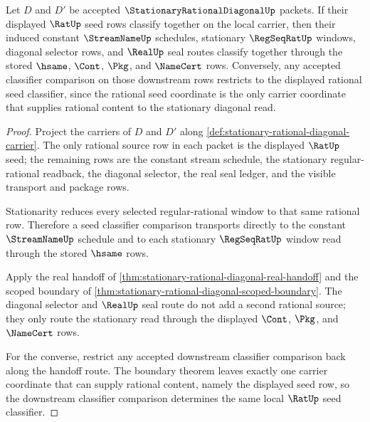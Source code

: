 \begin{theorem}
\label{thm:stationary-rational-diagonal-classifier-determinacy}
Let $D$ and $D'$ be accepted $\StationaryRationalDiagonalUp$ packets. If their
displayed $\RatUp$ seed rows classify together on the local carrier, then their
induced constant $\StreamNameUp$ schedules, stationary $\RegSeqRatUp$ windows,
diagonal selector rows, and $\RealUp$ seal routes classify together through the
stored $\hsame$, $\Cont$, $\Pkg$, and $\NameCert$ rows. Conversely, any accepted
classifier comparison on those downstream rows restricts to the displayed
rational seed classifier, since the rational seed coordinate is the only
carrier coordinate that supplies rational content to the stationary diagonal
read.
\end{theorem}
\begin{proof}
Project the carriers of $D$ and $D'$ along
\autoref{def:stationary-rational-diagonal-carrier}. The only rational source
row in each packet is the displayed $\RatUp$ seed; the remaining rows are the
constant stream schedule, the stationary regular-rational readback, the
diagonal selector, the real seal ledger, and the visible transport and package
rows.

Stationarity reduces every selected regular-rational window to that same
rational row. Therefore a seed classifier comparison transports directly to
the constant $\StreamNameUp$ schedule and to each stationary $\RegSeqRatUp$
window read through the stored $\hsame$ rows.

Apply the real handoff of
\autoref{thm:stationary-rational-diagonal-real-handoff} and the scoped boundary
of \autoref{thm:stationary-rational-diagonal-scoped-boundary}. The diagonal
selector and $\RealUp$ seal route do not add a second rational source; they
only route the stationary read through the displayed $\Cont$, $\Pkg$, and
$\NameCert$ rows.

For the converse, restrict any accepted downstream classifier comparison back
along the handoff route. The boundary theorem leaves exactly one carrier
coordinate that can supply rational content, namely the displayed seed row, so
the downstream classifier comparison determines the same local $\RatUp$ seed
classifier.
\end{proof}

